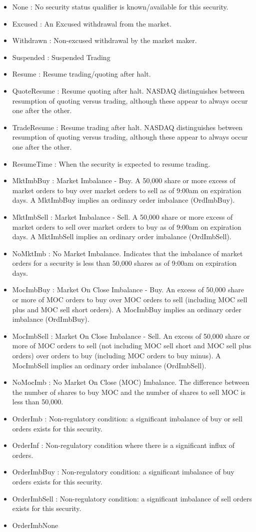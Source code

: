 \begin{itemize}
\item None : No security status qualifier is known/available for this security. \item Excused : An Excused withdrawal from the market. \item Withdrawn : Non-excused withdrawal by the market maker. \item Suspended : Suspended Trading \item Resume : Resume trading/quoting after halt. \item Quote\-Resume : Resume quoting after halt. NASDAQ distinguishes between resumption of quoting versus trading, although these appear to always occur one after the other. \item Trade\-Resume : Resume trading after halt. NASDAQ distinguishes between resumption of quoting versus trading, although these appear to always occur one after the other. \item Resume\-Time : When the security is expected to resume trading. \item Mkt\-Imb\-Buy : Market Imbalance - Buy. A 50,000 share or more excess of market orders to buy over market orders to sell as of 9:00am on expiration days. A Mkt\-Imb\-Buy implies an ordinary order imbalance (Ord\-Imb\-Buy). \item Mkt\-Imb\-Sell : Market Imbalance - Sell. A 50,000 share or more excess of market orders to sell over market orders to buy as of 9:00am on expiration days. A Mkt\-Imb\-Sell implies an ordinary order imbalance (Ord\-Imb\-Sell). \item No\-Mkt\-Imb : No Market Imbalance. Indicates that the imbalance of market orders for a security is less than 50,000 shares as of 9:00am on expiration days. \item Moc\-Imb\-Buy : Market On Close Imbalance - Buy. An excess of 50,000 share or more of MOC orders to buy over MOC orders to sell (including MOC sell plus and MOC sell short orders). A Moc\-Imb\-Buy implies an ordinary order imbalance (Ord\-Imb\-Buy). \item Moc\-Imb\-Sell : Market On Close Imbalance - Sell. An excess of 50,000 share or more of MOC orders to sell (not including MOC sell short and MOC sell plus orders) over orders to buy (including MOC orders to buy minus). A Moc\-Imb\-Sell implies an ordinary order imbalance (Ord\-Imb\-Sell). \item No\-Moc\-Imb : No Market On Close (MOC) Imbalance. The difference between the number of shares to buy MOC and the number of shares to sell MOC is less than 50,000. \item Order\-Imb : Non-regulatory condition: a significant imbalance of buy or sell orders exists for this security. \item Order\-Inf : Non-regulatory condition where there is a significant influx of orders. \item Order\-Imb\-Buy : Non-regulatory condition: a significant imbalance of buy orders exists for this security. \item Order\-Imb\-Sell : Non-regulatory condition: a significant imbalance of sell orders exists for this security. \item Order\-Imb\-None 
\end{itemize}
